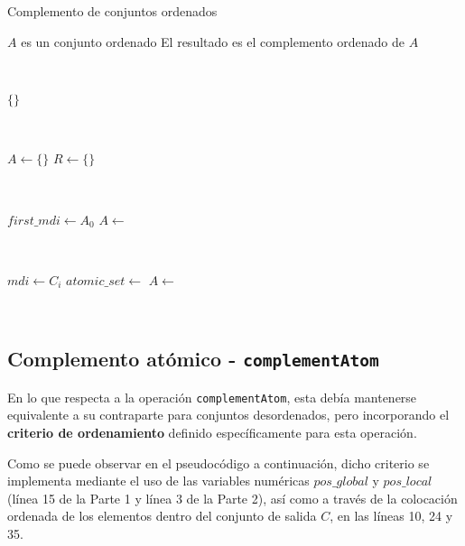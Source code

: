 \begin{algorithm}
\caption{Complemento de conjuntos ordenados}\label{alg:complement-conj-ord}
\begin{algorithmic}[1]
\Require $A$ es un conjunto ordenado
\Ensure El resultado es el complemento ordenado de $A$

\ 


    \State \Return $ \{\}$
\EndIf

\ 

\State $A \gets  \{\}$
\State $R \gets  \{\}$

\ 

\State $first\_mdi \gets A_0$
\State $A \gets$ 

\

    \State $mdi \gets C_i$
    \State $atomic\_set \gets$ 
    \State $A \gets$ 
\EndFor

\

\State \Return {}
\EndFunction
\end{algorithmic}
\end{algorithm}


\newpage
\subsection{Complemento atómico - \texttt{complementAtom}}

En lo que respecta a la operación \texttt{complementAtom}, esta debía mantenerse equivalente a su contraparte para conjuntos desordenados, pero incorporando el \textbf{criterio de ordenamiento} definido específicamente para esta operación.

Como se puede observar en el pseudocódigo a continuación, dicho criterio se implementa mediante el uso de las variables numéricas $pos\_global$ y $pos\_local$ (línea 15 de la Parte 1 y línea 3 de la Parte 2), así como a través de la colocación ordenada de los elementos dentro del conjunto de salida $C$, en las líneas 10, 24 y 35.

